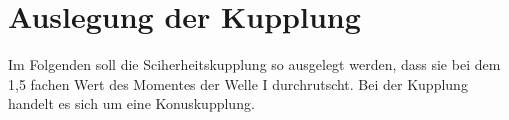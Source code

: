 \section{Auslegung der Kupplung }
Im Folgenden soll die Sciherheitskupplung so ausgelegt werden, dass sie bei dem 1,5 fachen Wert des Momentes der Welle I durchrutscht. Bei der Kupplung handelt es sich um eine Konuskupplung.
